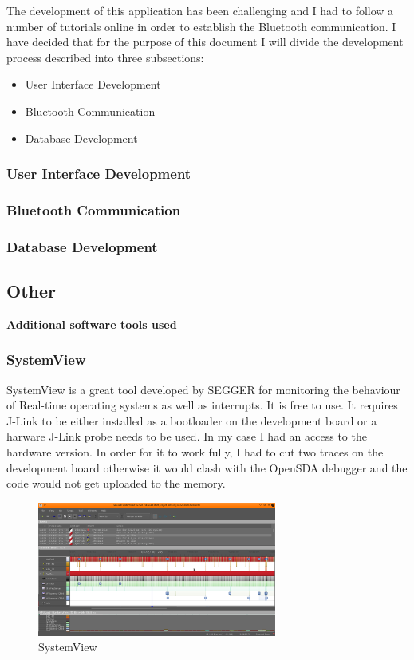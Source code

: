 \documentclass[12pt,a4paper]{article}
\begin{document}
		The development of this application has been challenging and I had to follow a number of tutorials online in order to establish the Bluetooth communication. I have decided that for the purpose of this document I will divide the development process described into three subsections:  
		
		\begin{itemize}
			\item User Interface Development
			\item Bluetooth Communication
			\item Database Development
		\end{itemize}
		
		
		\subsubsection{User Interface Development}
		
		\subsubsection{Bluetooth Communication}
		\subsubsection{Database Development}
		
		\newpage
		
		\subsection{Other}
		{\bfseries Additional software tools used}
		
		\subsubsection{SystemView}
		SystemView is a great tool developed by SEGGER for monitoring the behaviour of Real-time
		operating systems as well as interrupts. It is free to use. It requires J-Link to be either installed as a bootloader on the development board or a harware J-Link probe needs to be used. In my case I had an access to the hardware version. In order for it to work fully, I had to cut two traces on the development board otherwise it would clash with the OpenSDA debugger and the code would not get uploaded to the memory.
				
		\begin{figure}[h]
			\centering
			\includegraphics[width=0.7\textwidth]{systemview1}
			\caption{SystemView}
		\end{figure}
	
\end{document}

